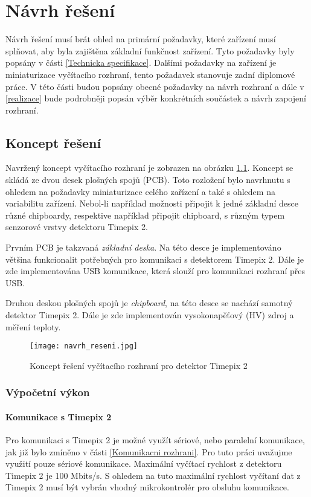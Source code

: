 \chapter{Návrh řešení} %
Návrh řešení musí brát ohled na primární požadavky, které zařízení musí splňovat, aby byla zajištěna základní funkčnost zařízení. Tyto požadavky byly popsány v části \ref{Technicka specifikace}. Dalšími požadavky na zařízení je miniaturizace vyčítacího rozhraní, tento požadavek stanovuje zadní diplomové práce. V této části budou popsány obecné požadavky na návrh rozhraní a dále v \ref{realizace} bude podrobněji popsán výběr konkrétních součástek a návrh zapojení rozhraní.

\section{Koncept řešení}
Navržený koncept vyčítacího rozhraní je zobrazen na obrázku \ref{fig:navrh_reseni}. Koncept se skládá ze dvou desek plošných spojů (PCB). Toto rozložení bylo navrhnutu s ohledem na požadavky miniaturizace celého zařízení a také s ohledem na variabilitu zařízení. Nebol-li například možnosti připojit k jedné základní desce různé chipboardy, respektive například připojit chipboard, s různým typem senzorové vrstvy detektoru Timepix 2. 
\par Prvním PCB je takzvaná \textit{základní deska}. Na této desce je implementováno většina funkcionalit potřebných pro komunikaci s detektorem Timepix 2. Dále je zde implementována USB komunikace, která slouží pro komunikaci rozhraní přes USB.
\par Druhou deskou plošných spojů je \textit{chipboard}, na této desce se nachází samotný detektor Timepix 2. Dále je zde implementován vysokonapěťový (HV) zdroj a měření teploty.
\begin{figure}[h!]
	\centering
	\captionsetup{justification=centering}
	\texttt{[image: navrh\_reseni.jpg]}
	\caption{Koncept řešení vyčítacího rozhraní pro detektor Timepix 2} 
	\label{fig:navrh_reseni}
\end{figure}

\subsection{Výpočetní výkon}
\subsubsection{Komunikace s Timepix 2}
Pro komunikaci s Timepix 2 je možné využít sériové, nebo paralelní komunikace, jak již bylo zmíněno v části \ref{Komunikacni rozhrani}. Pro tuto práci uvažujme využití pouze sériové komunikace. Maximální vyčítací rychlost z detektoru Timepix 2 je 100 Mbits/s. S ohledem na tuto maximální rychlost vyčítaní dat z Timepix 2 musí být vybrán vhodný mikrokontrolér pro obsluhu komunikace. 

